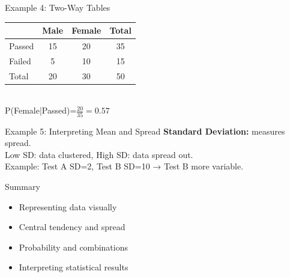 \documentclass{beamer}
\begin{document}
\begin{frame}{Example 4: Two-Way Tables}
\begin{tabular}{lcc|c}
 & Male & Female & Total \\
\hline
Passed & 15 & 20 & 35 \\
Failed & 5 & 10 & 15 \\
\hline
Total & 20 & 30 & 50 \\
\end{tabular}
\\
P(Female|Passed)=\(\frac{20}{35}=0.57\)
\end{frame}

\begin{frame}{Example 5: Interpreting Mean and Spread}
\textbf{Standard Deviation:} measures spread.
\\
Low SD: data clustered, High SD: data spread out.
\\
Example: Test A SD=2, Test B SD=10 → Test B more variable.
\end{frame}

\begin{frame}{Summary}
\begin{itemize}
  \item Representing data visually
  \item Central tendency and spread
  \item Probability and combinations
  \item Interpreting statistical results
\end{itemize}
\end{frame}
\end{document}
